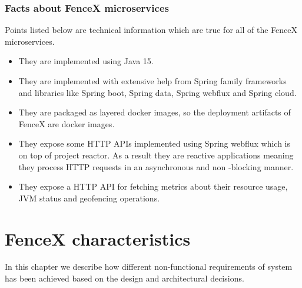 \documentclass[a4]{report}
\begin{document}
    \subsection{Facts about FenceX microservices}
    Points listed below are technical information which are true for all of the FenceX microservices.

    \begin{itemize}
        \item They are implemented using Java 15.
        \item They are implemented with extensive help from Spring family frameworks and libraries like Spring boot,
        Spring data, Spring webflux and Spring cloud.
        \item They are packaged as layered docker images, so the deployment artifacts of FenceX are docker images.
        \item They expose some HTTP APIs implemented using Spring webflux which is on top of project reactor.
        As a result they are reactive applications meaning they process HTTP requests in an asynchronous and non
        -blocking manner.
        \item They expose a HTTP API for fetching metrics about their resource usage, JVM status and geofencing
        operations.
    \end{itemize}


    \chapter{FenceX characteristics}
    In this chapter we describe how different non-functional requirements of system has been achieved based on the
    design and architectural decisions.
\end{document}
